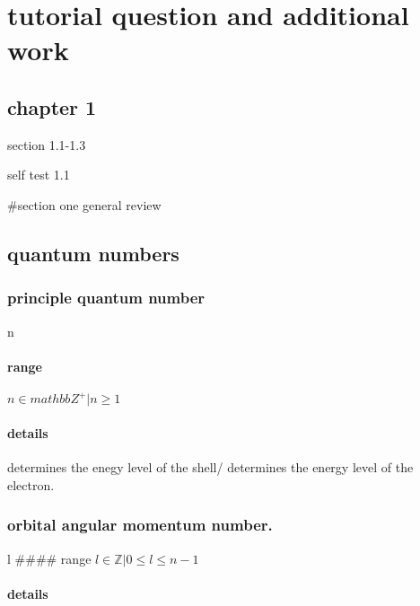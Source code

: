 \documentclass[]{article}
\date{}
\let\oldparagraph\paragraph
\renewcommand{\paragraph}[1]{\oldparagraph{#1}\mbox{}}
\begin{document}
\hypertarget{tutorial-question-and-additional-work}{%
\section{tutorial question and additional
work}\label{tutorial-question-and-additional-work}}

\hypertarget{chapter-1}{%
\subsection{chapter 1}\label{chapter-1}}

section 1.1-1.3

self test 1.1

\#section one general review

\hypertarget{quantum-numbers}{%
\subsection{quantum numbers}\label{quantum-numbers}}

\hypertarget{principle-quantum-number}{%
\subsubsection{principle quantum
number}\label{principle-quantum-number}}

n

\hypertarget{range}{%
\paragraph{range}\label{range}}

\(n \in mathbb{Z}^+ | n \geq 1\)

\hypertarget{details}{%
\paragraph{details}\label{details}}

determines the enegy level of the shell/ determines the energy level of
the electron.

\hypertarget{orbital-angular-momentum-number.}{%
\subsubsection{orbital angular momentum
number.}\label{orbital-angular-momentum-number.}}

l \#\#\#\# range \(l\in \mathbb{Z} | 0 \leq l \leq n-1\)

\hypertarget{details-1}{%
\paragraph{details}\label{details-1}}
\end{document}
